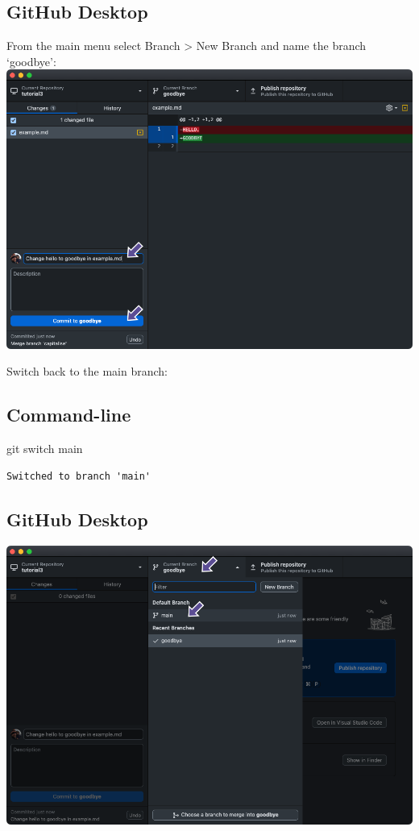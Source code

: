 \documentclass[
  letterpaper,
  DIV=11,
  numbers=noendperiod]{scrartcl}
\newenvironment{Shaded}{\begin{snugshade}}{\end{snugshade}}
\newcommand{\FunctionTok}[1]{\textcolor[rgb]{0.28,0.35,0.67}{#1}}
\newcommand{\NormalTok}[1]{\textcolor[rgb]{0.00,0.23,0.31}{#1}}
\begin{document}
\subsection{GitHub Desktop}

From the main menu select Branch \textgreater{} New Branch and name the
branch `goodbye': \includegraphics{images/image59.png}

Switch back to the main branch:

\subsection{Command-line}

\begin{Shaded}
\begin{Highlighting}[]
\FunctionTok{git}\NormalTok{ switch main}
\end{Highlighting}
\end{Shaded}

\begin{verbatim}
Switched to branch 'main'
\end{verbatim}

\subsection{GitHub Desktop}

\includegraphics{images/image60.png}
\end{document}
